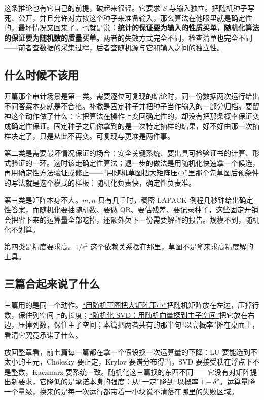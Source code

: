 这条推论也有它自己的前提，破起来很轻。它要求 \(S\) 与输入独立。把随机种子写死、公开，并且允许对方按这个种子来准备输入，那么算法在他眼里就是确定性的，最坏情况又回来了。也就是说：\textbf{统计的保证要为输入的性质买单，随机化算法的保证要为随机数的质量买单。}两者的失效方式完全不同，检查清单也完全不同——前者查数据的采集过程，后者查随机源与它和输入之间的独立性。

\subsection{什么时候不该用}

开篇那个审计场景是第一类。需要逐位可复现的结论时，同一份数据两次运行给出不同答案本身就是不合格。补救是固定种子并把种子当作输入的一部分归档。要留神这个动作做了什么：它把算法在操作上变回确定性的，却没有把那条概率保证变成确定性保证。固定种子之后你拿到的是一次特定抽样的结果，好不好由那一次抽样决定了，只是从此不再变。可复现与更准是两件事。

第二类是需要最坏情况保证的场合：安全关键系统、要出具可检验证书的计算、形式验证的一环。这时该走确定性算法；退一步的做法是用随机化快速拿一个候选，再用确定性方法验证或修正——\hyperref[sec:08-Numerical-Analysis/05-Numerical-Linear-Algebra/08]{``用随机草图把大矩阵压小''}里那个先草图后预条件的写法就是这个模式的样板：随机化负责快，确定性负责准。

第三类是矩阵本身不大。\(m,n\) 只有几千时，稠密 LAPACK 例程几秒钟给出确定性答案，而随机化要抽随机数、要做 QR、要估残差、要记录种子，这些固定开销会把省下来的运算量全部吃掉，还额外欠下一份需要解释的报告。规模不到，随机化不划算。

第四类是精度要求高。\(1/\epsilon^2\) 这个依赖关系摆在那里，草图不是拿来求高精度解的工具。

\subsection{三篇合起来说了什么}

三篇用的是同一个动作。\hyperref[sec:08-Numerical-Analysis/05-Numerical-Linear-Algebra/08]{``用随机草图把大矩阵压小''}把随机矩阵放在左边，压掉行数，保住列空间上的长度；\hyperref[sec:08-Numerical-Analysis/05-Numerical-Linear-Algebra/09]{``随机化 SVD：用随机向量探到主子空间''}把它放在右边，压掉列数，保住主子空间；本篇把两者共有的那半句``以高概率''摊在桌面上，看清它究竟承诺了什么。

放回整章看，前七篇每一篇都在拿一个假设换一次运算量的下降：LU 要能选到不太小的主元，Cholesky 要正定，Krylov 要谱分布得当，SVD 要接受秩在浮点下不是整数，Kaczmarz 要系统一致。随机化这三篇换的东西不同——它没有对矩阵提出新要求，它降低的是承诺本身的强度：从``一定''降到``以概率 \(1-\delta\)''。运算量降一个量级，换来的是每一次运行都带着一小块说不清落在哪里的失败区域。

